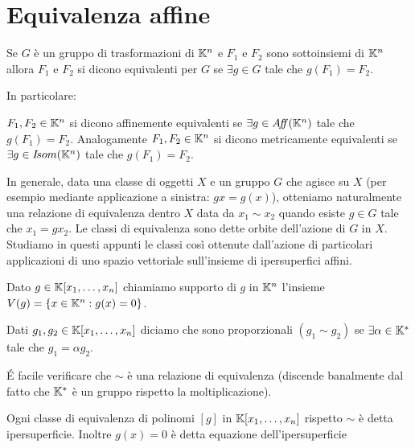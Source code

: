 \section{Equivalenza affine}

\begin{definition}
	Se $G$ è un gruppo di trasformazioni di $\mathbb K^n$ e $F_1$ e $F_2$ sono sottoinsiemi di $\mathbb K^n$ allora $F_1$ e $F_2$ si dicono equivalenti per 
	$G$ se $\exists g\in G$ tale che $g(F_1)=F_2$.
\end{definition}

In particolare:

\begin{definition}
	$F_1,F_2\in\mathbb K^n$ si dicono affinemente equivalenti se $\exists g \in A\!f\!\!f(\mathbb K^n)$ tale che $g(F_1) = F_2 .$
	Analogamente $F_1 , F_2 \in \mathbb K^n$ si dicono metricamente equivalenti se $\exists g \in I\!som(\mathbb K^n)$ tale che $g(F_1) = F_2 .$
\end{definition}
\begin{remark}
	In generale, data una classe di oggetti $X$ e un gruppo $G$ che agisce su $X$ (per esempio mediante applicazione a sinistra: $gx=g(x)$),
	otteniamo naturalmente una relazione di equivalenza dentro $X$ data da $x_1\sim x_2$ quando esiste $g\in G$ tale che $ x_1 = gx_2$.
	Le classi di equivalenza sono dette orbite dell'azione di $G$ in $X$. Studiamo in questi appunti le classi così ottenute dall'azione
	di particolari applicazioni di uno spazio vettoriale sull'insieme di ipersuperfici affini.
\end{remark}




\begin{definition}
	Dato $g\in \mathbb K[x_1,\dots,x_n]$ chiamiamo supporto di $g$ in $\mathbb K^n$ l'insieme $V(g)=\{x\in \mathbb K^n : g(x)=0\}$.
\end{definition}

\begin{definition}
	Dati $g_1,g_2\in \mathbb K[x_1,\dots,x_n]$ diciamo che sono proporzionali $(g_1\sim g_2)$ se $\exists \alpha \in \mathbb K^{*}$ tale che $g_1=\alpha g_2$.
\end{definition}
\begin{remark}
	\'E facile verificare che $\sim$ è una relazione di equivalenza
	(discende banalmente dal fatto che $\mathbb K^{*}$ è un gruppo rispetto la moltiplicazione).
\end{remark}

\begin{definition}
	Ogni classe di equivalenza di polinomi $[g]$ in $\mathbb K[x_1,\dots,x_n]$ rispetto $\sim$ è detta ipersuperficie.
	Inoltre $g(x)=0$ è detta equazione dell'ipersuperficie
\end{definition}


